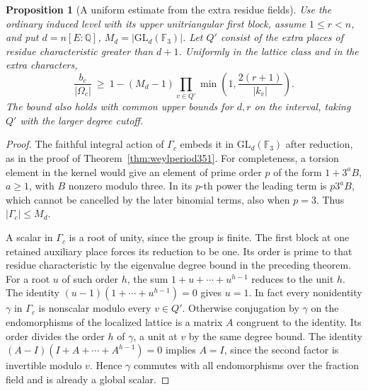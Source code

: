\documentclass[a4paper,11pt]{article}
\newtheorem{proposition}{Proposition}[section]
\theoremstyle{definition}
\theoremstyle{remark}
\numberwithin{equation}{section}
\begin{document}
\begin{proposition}[A uniform estimate from the extra residue fields]
\leavevmode\label{prop:freeflags380}
Use the ordinary induced level with its upper unitriangular
first block, assume \(1\le r<n\), and put \(d=n[E:\mathbb Q]\),
\(M_d=|\mathrm{GL}_d(\mathbb F_3)|\). Let \(Q'\) consist of
the extra places of residue characteristic greater than \(d+1\).
Uniformly in the lattice class and in the extra characters,
\[
 \frac{b_c}{|\Omega_c|}\ \ge\
  1-(M_d-1)\prod_{v\in Q'}
                \min\!\left(1,\frac{2(r+1)}{|k_v|}\right).
\]
The bound also holds with common upper bounds for \(d,r\) on
the interval, taking \(Q'\) with the larger degree cutoff.
\end{proposition}
\begin{proof}
The faithful integral action of \(\Gamma_c\) embeds it in
\(\mathrm{GL}_d(\mathbb F_3)\) after reduction, as in the proof
of Theorem~\ref{thm:weylperiod351}. For completeness, a torsion
element in the kernel would give an element of prime order
\(p\) of the form \(1+3^aB\), \(a\ge1\), with \(B\) nonzero
modulo three. In its \(p\)-th power the leading term is
\(p3^aB\), which cannot be cancelled by the later binomial
terms, also when \(p=3\). Thus \(|\Gamma_c|\le M_d\).

A scalar in \(\Gamma_c\) is a root of unity, since the group is
finite. The first block at one retained auxiliary place forces
its reduction to be one. Its order is prime to that residue
characteristic by the eigenvalue degree bound in the preceding
theorem. For a root \(u\) of such order \(h\), the sum
\(1+u+\cdots+u^{h-1}\) reduces to the unit \(h\).
The identity \((u-1)(1+\cdots+u^{h-1})=0\) gives \(u=1\).
In fact every nonidentity \(\gamma\) in \(\Gamma_c\) is
nonscalar modulo every \(v\in Q'\). Otherwise conjugation by
\(\gamma\) on the endomorphisms of the localized lattice is a
matrix \(A\) congruent to the identity. Its order divides the
order \(h\) of \(\gamma\), a unit at \(v\) by the same degree
bound. The identity \((A-I)(I+A+\cdots+A^{h-1})=0\)
implies \(A=I\), since the second factor is invertible modulo
\(v\). Hence \(\gamma\) commutes with all endomorphisms over
the fraction field and is already a global scalar.


\end{proof}
\end{document}

